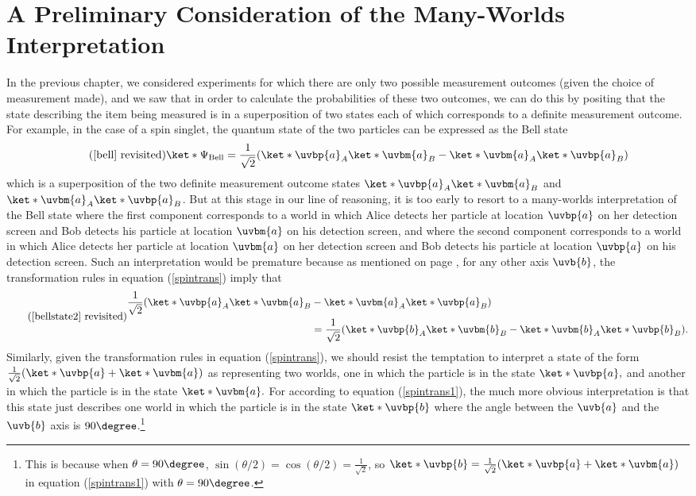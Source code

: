 \documentclass[12pt]{report}
\begin{document}
\section{A Preliminary Consideration of the Many-Worlds Interpretation}
     In the previous chapter, we considered experiments for which there are only two possible measurement outcomes (given the choice of measurement made), and we saw that in order to calculate the probabilities of these two outcomes, we can do this by positing that the state describing the item being measured is in a superposition of two states each of which corresponds to a definite measurement outcome. For example, in the case of a spin singlet, the quantum state of the two particles can be expressed as the Bell state
     \begin{equation}\tag{\ref{bell} revisited}          
          \ket*{\Psi_{\text{Bell}}}=\frac{1}{\sqrt{2}}(\ket*{\uvbp{a}}_A\ket*{\uvbm{a}}_B-\ket*{\uvbm{a}}_A\ket*{\uvbp{a}}_B) 
      \end{equation}
     which is a superposition of the two definite measurement outcome states  $\ket*{\uvbp{a}}_A\ket*{\uvbm{a}}_B$ and $\ket*{\uvbm{a}}_A\ket*{\uvbp{a}}_B$.
    But at this stage in our line of reasoning, it is too early to resort to a many-worlds interpretation of the Bell state where  the first component corresponds to a world in which Alice detects her particle at location $\uvbp{a}$ on her detection screen and Bob detects his particle at location $\uvbm{a}$ on his detection screen, and where the second component corresponds to a world in which Alice detects her particle at location $\uvbm{a}$ on her detection screen and Bob detects his particle at location $\uvbp{a}$ on his detection screen. Such an interpretation would be premature because as mentioned on page \pageref{bellstate2}, for any other axis $\uvb{b}$, the transformation rules in equation (\ref{spintrans}) imply that  
    \begin{equation*}\tag{\ref{bellstate2} revisited}
     \begin{split}
     \frac{1}{\sqrt{2}}(\ket*{\uvbp{a}}_A\ket*{\uvbm{a}}_B&-\ket*{\uvbm{a}}_A\ket*{\uvbp{a}}_B)\\
     &=\frac{1}{\sqrt{2}}(\ket*{\uvbp{b}}_A\ket*{\uvbm{b}}_B-\ket*{\uvbm{b}}_A\ket*{\uvbp{b}}_B).
\end{split}
\end{equation*}
    Similarly, given the transformation rules in equation (\ref{spintrans}), we should resist the temptation  to interpret a state of the form $\frac{1}{\sqrt{2}}(\ket*{\uvbp{a}}+\ket*{\uvbm{a}})$ as representing two worlds, one in which the particle is in the state $\ket*{\uvbp{a}},$ and another in which the particle is in the state $\ket*{\uvbm{a}}.$ For according to equation (\ref{spintrans1}), the much more obvious interpretation is that this state just describes one world in which the particle is in the state $\ket*{\uvbp{b}}$ where the angle between
     the $\uvb{a}$ and the  $\uvb{b}$ axis is $90\degree$.\footnote{This is because when $\theta=90\degree$, $\sin(\theta/2)=\cos(\theta/2)=\frac{1}{\sqrt{2}}$, so  $\ket*{\uvbp{b}}= \frac{1}{\sqrt{2}}(\ket*{\uvbp{a}}+\ket*{\uvbm{a}})$ in equation (\ref{spintrans1}) with $\theta=90\degree$. } 
     
\end{document}
